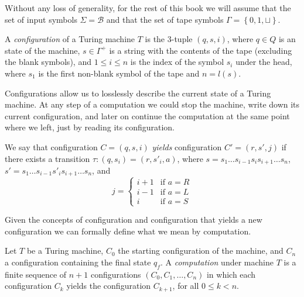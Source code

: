 Without any loss of generality, for the rest of this book we will assume that the set of input symbols $\Sigma = \mathcal{B}$ and that the set of tape symbols $\Gamma = \left\{0, 1, \sqcup \right\}$.

\begin{definition}
A \emph{configuration} of a Turing machine $T$ is the 3-tuple $\left(q,s,i\right)$, where $q\in Q$ is an state of the machine, $s\in\Gamma^+$ is a string with the contents of the tape (excluding the blank symbols), and $1 \le i \le n$ is the index of the symbol $s_i$ under the head, where $s_1$ is the first non-blank symbol of the tape and $n=l(s)$. 
\end{definition}

Configurations allow us to losslessly describe the current state of a Turing machine. At any step of a computation we could stop the machine, write down its current configuration, and later on continue the computation at the same point where we left, just by reading its configuration.

\begin{definition}
We say that configuration $C=\left(q,s,i\right)$ \emph{yields} configuration $C'=\left(r,s',j\right)$ if there exists a transition $\tau:\left(q, s_{i}\right) = \left(r, s'_{i}, a\right)$, where $s=s_{1} \dots s_{i-1}s_{i}s_{i+1} \dots s_{n}$, $s'=s_{1} \dots s_{i-1}s'_{i}s_{i+1} \dots s_{n}$, and
\begin{equation}
  j = \begin{cases}
        i+1 & \text{if $a=R$} \\
        i-1 & \text{if $a=L$} \\
        i   & \text{if $a=S$}
  \end{cases}
\end{equation}
\end{definition}

Given the concepts of configuration and configuration that yields a new configuration we can formally define what we mean by computation.

\begin{definition}[Computation]
Let $T$ be a Turing machine, $C_{0}$ the starting configuration of the machine, and $C_n$ a configuration containing the final state $q_f$. A \emph{computation} under machine $T$ is a finite sequence of $n+1$ configurations $\left(C_{0},C_{1},\ldots,C_n\right)$ in which each configuration $C_{k}$ yields the configuration $C_{k+1}$, for all $0\leq k < n$.
\end{definition}


